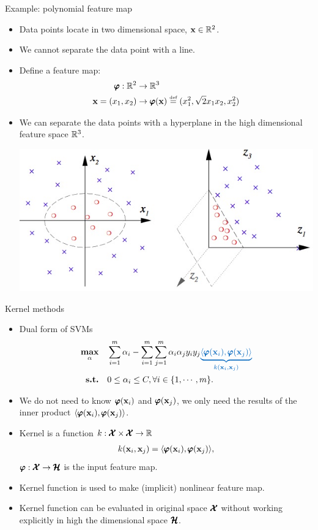 \documentclass[first=dgreen,second=purple,logo=yellowexc]{aaltoslides}
\begin{document}
{\begin{frame}{Example: polynomial feature map}
	\begin{itemize}
		\item Data points locate in two dimensional space, $\mathbf {x}\in\mathbb{R}^2$.
		\item We cannot separate the data point with a line.
		\item Define a feature map: 
		\begin{align*}
			\pmb \varphi:\mathbb{R}^2 & \rightarrow\mathbb{R}^3\\
			\mathbf {x}=(x_1,x_2) & \rightarrow \pmb \varphi(\mathbf {x}) \overset{{\rm \mbox{\tiny def}}}{=} (x_1^2,\sqrt{2}x_1x_2, x_2^2)
		\end{align*}
		\item We can separate the data points with a hyperplane in the high dimensional feature space $\mathbb{R}^3$.
		\begin{center}
			\includegraphics[scale=0.3]{./figures/polynomialfeaturemap.jpg}
		\end{center}
	\end{itemize}
\end{frame}

\begin{frame}{Kernel methods}
	\begin{itemize}
		\item Dual form of SVMs
		\begin{align*}
			\underset{\valpha}{\maximize} &\quad \sum_{i=1}^m\alpha_i - \sum_{i=1}^m\sum_{j=1}^m\alpha_i\alpha_jy_iy_j{\color{aaltoblue}\underbrace{\ip{\varphib(\vx_i)}{\varphib(\vx_j)}}_{k(\vx_i,\vx_j)}}\\
			\st &\quad 0\le\alpha_i\le C, \forall i\in\{1,\cdots,m\}.
		\end{align*}
		\item We do not need to know $\pmb \varphi(\mathbf {x}_i)$ and $\pmb \varphi(\mathbf {x}_j)$, we only need the results of the inner product $\langle \pmb \varphi(\mathbf {x}_i), \pmb \varphi(\mathbf {x}_j) \rangle$.
		\item Kernel is a function $k:\pmb {\mathcal{X}}\times\pmb {\mathcal{X}}\rightarrow\mathbb{R}$
		\begin{align*}
			k(\mathbf {x}_i,\mathbf {x}_j) = \langle \pmb \varphi(\mathbf {x}_i), \pmb \varphi(\mathbf {x}_j) \rangle,
		\end{align*}
		$\pmb \varphi:\pmb {\mathcal{X}}\rightarrow\pmb {\mathcal{H}}$ is the input feature map.
		\item Kernel function is used to make (implicit) nonlinear feature map.
		\item Kernel function can be evaluated in original space $\pmb {\mathcal{X}}$ without working explicitly in high the dimensional space $\pmb {\mathcal{H}}$.
	\end{itemize}
\end{frame}

}
\end{document}
